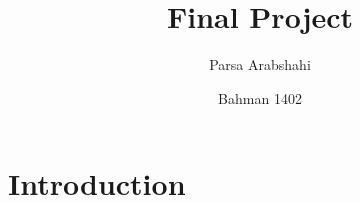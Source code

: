 \documentclass{article}
\title{Final Project}
\author{Parsa Arabshahi }
\date{Bahman 1402}
\begin{document}
\begin{titlepage}
\maketitle
\end{titlepage}
\newpage
{}
\tableofcontents
\newpage
\section{Introduction}
\end{document}
